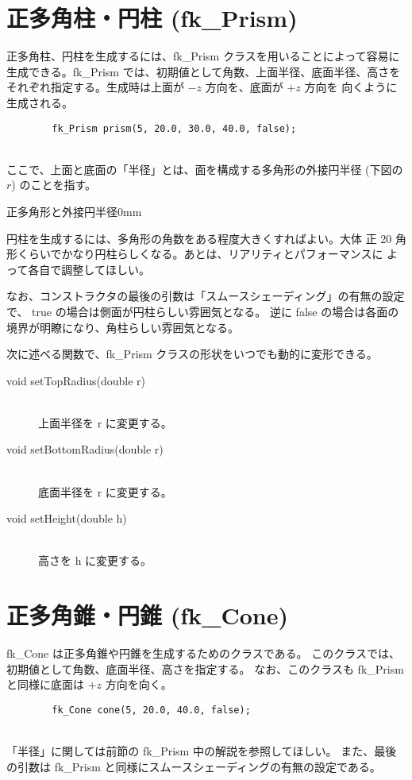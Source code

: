 \section{正多角柱・円柱 (fk\_Prism)}
正多角柱、円柱を生成するには、fk\_Prism クラスを用いることによって容易に
生成できる。fk\_Prism では、初期値として角数、上面半径、底面半径、高さを
それぞれ指定する。生成時は上面が \(-z\) 方向を、底面が \(+z\) 方向を
向くように生成される。
\\
\begin{screen}
\begin{verbatim}
        fk_Prism prism(5, 20.0, 30.0, 40.0, false);
\end{verbatim}
\end{screen}
~ \\
ここで、上面と底面の「半径」とは、面を構成する多角形の外接円半径
(下図の \(r\)) のことを指す。

	{正多角形と外接円半径}{0mm}

円柱を生成するには、多角形の角数をある程度大きくすればよい。大体
正 20 角形くらいでかなり円柱らしくなる。あとは、リアリティとパフォーマンスに
よって各自で調整してほしい。

なお、コンストラクタの最後の引数は「スムースシェーディング」の有無の設定で、
true の場合は側面が円柱らしい雰囲気となる。
逆に false の場合は各面の境界が明瞭になり、角柱らしい雰囲気となる。

次に述べる関数で、fk\_Prism クラスの形状をいつでも動的に変形できる。
\begin{description}
\item[void setTopRadius(double r)]~ \\
	上面半径を r に変更する。\\

\item[void setBottomRadius(double r)] ~ \\
	底面半径を r に変更する。\\

\item[void setHeight(double h)] ~ \\
	高さを h に変更する。
\end{description}

\section{正多角錐・円錐 (fk\_Cone)}
fk\_Cone は正多角錐や円錐を生成するためのクラスである。
このクラスでは、初期値として角数、底面半径、高さを指定する。
なお、このクラスも fk\_Prism と同様に底面は \(+z\) 方向を向く。
\\
\begin{screen}
\begin{verbatim}
        fk_Cone cone(5, 20.0, 40.0, false);
\end{verbatim}
\end{screen}
~ \\
「半径」に関しては前節の fk\_Prism 中の解説を参照してほしい。
また、最後の引数は fk\_Prism と同様にスムースシェーディングの有無の設定である。

